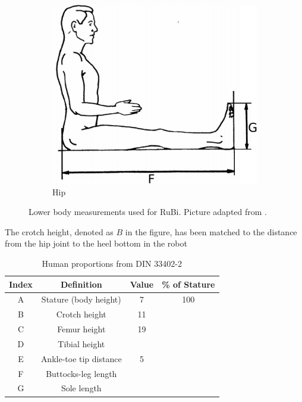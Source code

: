 \begin{figure}[h]
\begin{subfigure}[b]{0.4\textwidth}
        \includegraphics[width=\textwidth]{figures/din_measurements2.pdf}
        \caption{Hip}
        \label{fig:din2}
    \end{subfigure}
	\caption{Lower body measurements used for RuBi. Picture adapted from \cite{din_measurements1}.}
	\label{fig:human_measurements}
\end{figure}

The crotch height, denoted as $B$ in the figure, has been matched to the distance from the hip joint to the heel bottom in the robot 

\begin{table}
\begin{center}
	\begin{tabular}{c | c | c | c}
	  Index & Definition & Value & \% of Stature \\
	  \hline
	  A & Stature (body height) & 7 & 100 \\
	  B & Crotch height & 11 & \\
	  C & Femur height & 19 & \\
	  D & Tibial height & & \\
	  E & Ankle-toe tip distance & 5 & \\
	  F & Buttocks-leg length & & \\
	  G & Sole length & & 
	\end{tabular}
	\caption{Human proportions from DIN 33402-2}
	\label{tab:din_proportions}
\end{center}
\end{table}




